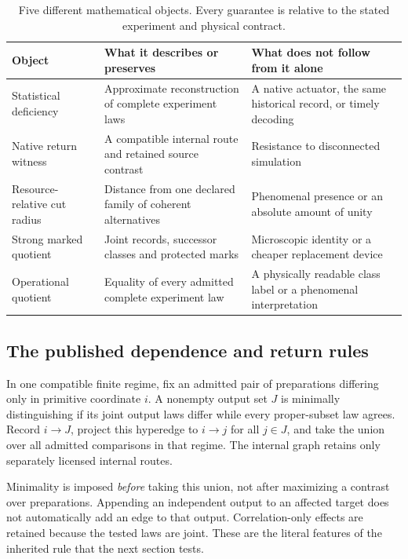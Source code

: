 \begin{table}[tb]
\centering\small
\caption{Five different mathematical objects. Every guarantee is relative to the stated experiment and physical contract.}\label{tab:five-objects}
\begin{tabularx}{\textwidth}{@{}>{\raggedright\arraybackslash}p{}YY@{}}
\toprule Object & What it describes or preserves & What does not follow from it alone\\\midrule
Statistical deficiency & Approximate reconstruction of complete experiment laws & A native actuator, the same historical record, or timely decoding\\
Native return witness & A compatible internal route and retained source contrast & Resistance to disconnected simulation\\
Resource-relative cut radius & Distance from one declared family of coherent alternatives & Phenomenal presence or an absolute amount of unity\\
Strong marked quotient & Joint records, successor classes and protected marks & Microscopic identity or a cheaper replacement device\\
Operational quotient & Equality of every admitted complete experiment law & A physically readable class label or a phenomenal interpretation\\
\bottomrule
\end{tabularx}
\end{table}

\subsection{The published dependence and return rules}
\begin{definition}\label{def:minimal-target}
In one compatible finite regime, fix an admitted pair of preparations differing only in primitive coordinate \(i\). A nonempty output set \(J\) is minimally distinguishing if its joint output laws differ while every proper-subset law agrees. Record \(i\to J\), project this hyperedge to \(i\to j\) for all \(j\in J\), and take the union over all admitted comparisons in that regime. The internal graph retains only separately licensed internal routes.
\end{definition}
Minimality is imposed \emph{before} taking this union, not after maximizing a contrast over preparations. Appending an independent output to an affected target does not automatically add an edge to that output. Correlation-only effects are retained because the tested laws are joint. These are the literal features of the inherited rule that the next section tests.

